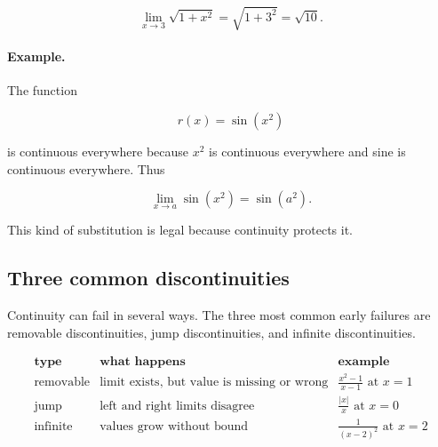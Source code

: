 \[
\lim_{x\to3}\sqrt{1+x^2}
=
\sqrt{1+3^2}
=
\sqrt{10}.
\]

\paragraph{Example.}
The function

\[
r(x)=\sin(x^2)
\]

is continuous everywhere because \(x^2\) is continuous everywhere and sine is continuous everywhere.  Thus

\[
\lim_{x\to a}\sin(x^2)=\sin(a^2).
\]

This kind of substitution is legal because continuity protects it.

\subsection{Three common discontinuities}
\label{subsec:three-common-discontinuities}

Continuity can fail in several ways.  The three most common early failures are removable discontinuities, jump discontinuities, and infinite discontinuities.

\[
\begin{array}{c|c|c}
\textbf{type} & \textbf{what happens} & \textbf{example} \\ \hline
\text{removable} &
\text{limit exists, but value is missing or wrong}
&
\displaystyle \frac{x^2-1}{x-1}\text{ at }x=1 \\[10pt]
\text{jump} &
\text{left and right limits disagree}
&
\displaystyle \frac{|x|}{x}\text{ at }x=0 \\[10pt]
\text{infinite} &
\text{values grow without bound}
&
\displaystyle \frac{1}{(x-2)^2}\text{ at }x=2
\end{array}
\]

